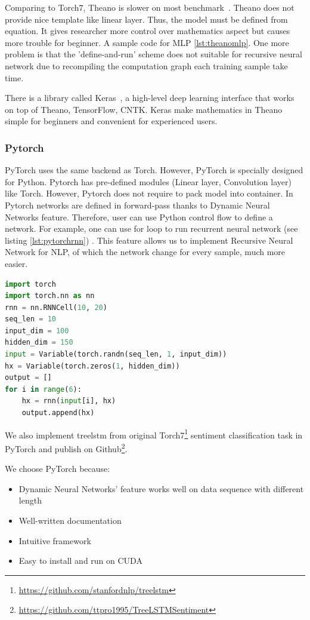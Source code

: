 Comparing to Torch7, Theano is slower on most benchmark~\cite{collobert2011torch7}. Theano does not provide nice template like linear layer. Thus, the model must be defined from equation. It gives researcher more control over mathematics aspect but causes more trouble for beginner. A sample code for MLP \ref{lst:theanomlp}. One more problem is that the 'define-and-run' scheme does not suitable for recursive neural network due to recompiling the computation graph each training sample take time.

There is a library called Keras~\cite{chollet2017keras}, a high-level deep learning interface that works on top of Theano, TensorFlow, CNTK. Keras make mathematics in Theano simple for beginners and convenient for experienced users.

\subsubsection{Pytorch}\label{sec:pytorch}
PyTorch uses the same backend as Torch. However, PyTorch is specially designed for Python. Pytorch has pre-defined modules (Linear layer, Convolution layer) like Torch. However, Pytorch does not require to pack model into container. In Pytorch networks are defined in forward-pass thanks to Dynamic Neural Networks feature. Therefore, user can use Python control flow to define a network. For example, one can use for loop to run recurrent neural network (see listing \ref{lst:pytorchrnn}) .
This feature allows us to implement Recursive Neural Network for NLP, of which the network change for every sample, much more easier.

\begin{lstlisting}[caption={RNN},label={lst:pytorchrnn}, language={python}]
import torch
import torch.nn as nn
rnn = nn.RNNCell(10, 20)
seq_len = 10
input_dim = 100
hidden_dim = 150
input = Variable(torch.randn(seq_len, 1, input_dim))
hx = Variable(torch.zeros(1, hidden_dim))
output = []
for i in range(6):
    hx = rnn(input[i], hx)
    output.append(hx)
\end{lstlisting}

We also implement treelstm from original Torch7\footnote{\url{https://github.com/stanfordnlp/treelstm}} sentiment classification task in PyTorch and publish on Github\footnote{\url{https://github.com/ttpro1995/TreeLSTMSentiment}}.

We choose PyTorch because:
\begin{itemize}
    \item Dynamic Neural Networks' feature works well on data sequence with different length
    \item Well-written documentation
    \item Intuitive framework
    \item Easy to install and run on CUDA
\end{itemize}
